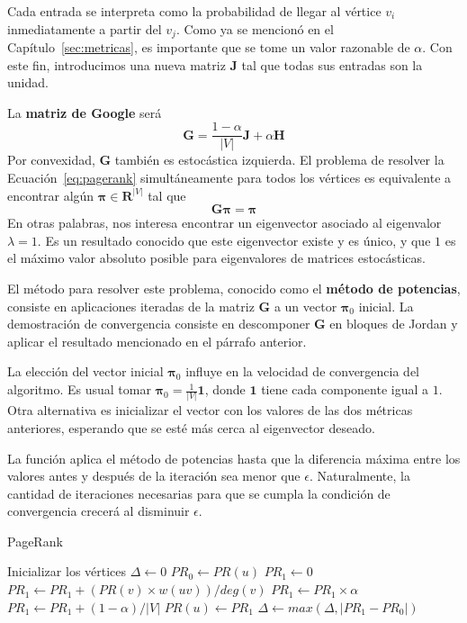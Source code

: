 \documentclass[journal]{IEEEtran}
\let\MYoriglatexcaption\caption
\renewcommand{\caption}[2][\relax]{\MYoriglatexcaption[#2]{#2}}
\newcommand{\matr}[1]{\mathbf{#1}} %
\begin{document}
Cada entrada se interpreta como la probabilidad de llegar al vértice \(v_i\) inmediatamente a partir del \(v_j\). Como ya se mencionó en el Capítulo~\ref{sec:metricas}, es importante que se tome un valor razonable de \(\alpha\). Con este fin, introducimos una nueva matriz \(\matr{J}\) tal que todas sus entradas son la unidad.

La \textbf{matriz de Google} será \cite{langville}
\begin{equation}
	\matr{G} = \frac{1-\alpha}{|V|} \matr{J} + \alpha \matr{H}
\end{equation}
Por convexidad, \(\matr{G}\) también es estocástica izquierda. El problema de resolver la Ecuación~\ref{eq:pagerank} simultáneamente para todos los vértices es equivalente a encontrar algún \(\bm{\pi} \in \mathbf{R}^{|V|} \) tal que
\begin{equation}
	\matr{G} \bm{\pi} = \bm{\pi}
\end{equation}
En otras palabras, nos interesa encontrar un eigenvector asociado al eigenvalor \(\lambda = 1\). Es un resultado conocido que este eigenvector existe y es único, y que \(1\) es el máximo valor absoluto posible para eigenvalores de matrices estocásticas\cite{meyer}.

El método para resolver este problema, conocido como el \textbf{método de potencias}, consiste en aplicaciones iteradas de la matriz \(\matr{G}\) a un vector \(\bm{\pi}_0\) inicial. La demostración de convergencia consiste en descomponer \(\matr{G}\) en bloques de Jordan y aplicar el resultado mencionado en el párrafo anterior\cite{langville}.

La elección del vector inicial \(\bm{\pi}_0\) influye en la velocidad de convergencia del algoritmo. Es usual tomar \(\bm{\pi}_0 = \frac{1}{|V|} \bm{1} \), donde \(\bm{1}\) tiene cada componente igual a \(1\). Otra alternativa es inicializar el vector con los valores de las dos métricas anteriores, esperando que se esté más cerca al eigenvector deseado.

La función  aplica el método de potencias hasta que la diferencia máxima entre los valores antes y después de la iteración sea menor que \(\epsilon\). Naturalmente, la cantidad de iteraciones necesarias para que se cumpla la condición de convergencia crecerá al disminuir \(\epsilon\).

\begin{algorithm}[H]
	\caption{PageRank} \label{alg:pagerank}
	\begin{algorithmic}
			\State Inicializar los vértices
			\Do
				\State $\Delta \gets 0$
					\State $PR_0 \gets PR(u)$
					\State $PR_1 \gets 0$
						\State $PR_1 \gets PR_1 + (PR(v) \times w(uv))/deg(v)$
					\EndFor
					\State $PR_1 \gets PR_1 \times \alpha$
					\State $PR_1 \gets PR_1 + (1-\alpha)/|V|$
					\State $PR(u) \gets PR_1$
					\State $\Delta \gets max(\Delta, |PR_1 - PR_0|)$
				\EndFor
			\doWhile{$\Delta > \epsilon$}
		\EndFunction
	\end{algorithmic}
\end{algorithm}
\end{document}
